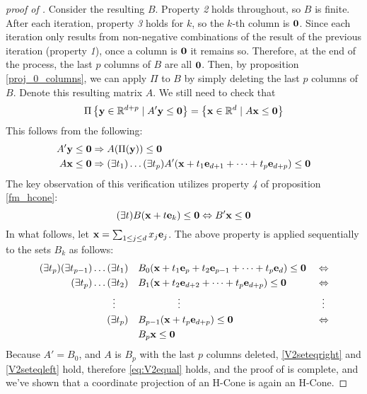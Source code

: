 \begin{proof}[proof of \Vproj]
	Consider the resulting $B$.  Property \textit{2} holds throughout, so $B$ is finite.  After each iteration, property \textit{3} holds for $k$, so the $k$-th column is $\mathbf{0}$.  Since each iteration only results from non-negative combinations of the result of the previous iteration (property \textit{1}), once a column is $\mathbf{0}$ it remains so.  Therefore, at the end of the process, the last $p$ columns of $B$ are all $\mathbf{0}$.  Then, by proposition \ref{proj_0_columns}, we can apply $\Pi$ to $B$ by simply deleting the last $p$ columns of $B$.  Denote this resulting matrix $A$.  We still need to check that
	\begin{equation}\label{eq:V2equal}
		\Pi\left\{\mathbf{y}\in\mathbb{R}^{d+p}\;|\; A'\mathbf{y}\leq\mathbf{0}\right\} = \left\{\mathbf{x}\in\mathbb{R}^{d}\;|\; A\mathbf{x}\leq\mathbf{0}\right\}
	\end{equation}
	This follows from the following:
	\begin{align}
		A'\mathbf{y} & \leq \mathbf{0} \Rightarrow A(\Pi(\mathbf{y})) \leq \mathbf{0} \label{V2seteqright}                                                           \\
		A\mathbf{x}  & \leq \mathbf{0} \Rightarrow (\exists t_1)\dots(\exists t_p) A'(\mathbf{x}+t_1\mathbf{e}_{d+1}+\cdots+t_p\mathbf{e}_{d+p}) \leq \mathbf{0} \label{V2seteqleft}
	\end{align}
	The key observation of this verification utilizes property \textit{4} of proposition \ref{fm_hcone}:
	\[ (\exists t)B(\mathbf{x} + t\mathbf{e}_k) \leq \mathbf{0} \Leftrightarrow B'\mathbf{x} \leq \mathbf{0} \]
	In what follows, let $\mathbf{x} = \sum_{1 \leq j \leq d}x_j\mathbf{e}_j$.  The above property is applied sequentially to the sets $B_k$ as follows:
	\begin{alignat*}{2}
		(\exists t_p)(\exists t_{p-1})\dots(\exists t_1)                & \quad
		B_0(\mathbf{x} + t_1\mathbf{e}_{p} + t_2\mathbf{e}_{p-1} + \dots + t_p\mathbf{e}_{d}) \leq \mathbf{0}\; & \Leftrightarrow                                                 \\
		(\exists t_p)\dots(\exists t_2)                                 & \quad
		B_1(\mathbf{x} + t_2\mathbf{e}_{d+2} + \dots + t_p\mathbf{e}_{d+p})
		\leq \mathbf{0}                                                         & \Leftrightarrow                                                 \\
		\vdots \hspace{1.3em}                                           & \hspace{5em}\vdots                       & \vdots\hspace{0.4em} \\
		(\exists t_p)                                                   & \quad B_{p-1}(\mathbf{x} + t_p\mathbf{e}_{d+p})  \leq \mathbf{0} & \Leftrightarrow      \\
		                                                                & \quad B_{p}\mathbf{x}  \leq \mathbf{0}                   &
	\end{alignat*}
	Because $A' = B_0$, and $A$ is $B_p$ with the last $p$ columns deleted, \eqref{V2seteqright} and \eqref{V2seteqleft} hold, therefore \eqref{eq:V2equal} holds, and the proof of {\Vproj} is complete, and we've shown that a coordinate projection of an H-Cone is again an H-Cone.
\end{proof}

